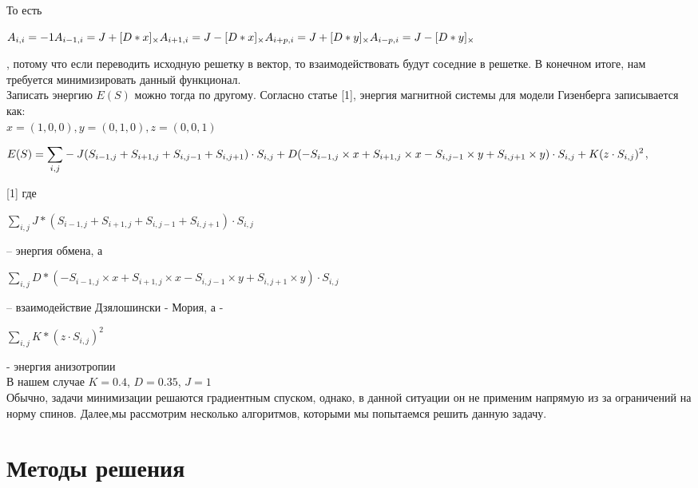 \documentclass[ 12pt,x11names]{article}
\begin{document}
    То есть  \begin{center} $A_{i, i} = -1 \\ A_{i - 1, i} =  J + [D*x]_\times \\
    A_{i+1, i} =  J - [D*x]_\times \\
    A_{i + p, i} =  J + [D*y]_\times \\
    A_{i - p , i} =  J -  [D*y]_\times$
     \end{center}, потому что если переводить исходную решетку в вектор, то взаимодействовать будут соседние в решетке.
    В конечном итоге, нам требуется минимизировать данный функционал.\\
    Записать энергию $E(S)$ можно тогда по другому.
    Согласно статье [1], энергия магнитной системы для модели Гизенберга записывается как:\\
    $x = (1,0, 0), y = (0,1, 0), z =(0, 0 , 1)$\\
        \begin{center}
    $E(S) = \displaystyle{\sum_{i, j}} - J (S_{i - 1, j} + S_{i + 1, j} + S_{i, j - 1} + S_{i, j + 1}) \cdot S_{i,j} + \\
    D  (-S_{i - 1, j} \times x  + S_{i + 1, j} \times x - S_{i, j - 1} \times y + S_{i, j + 1} \times y)\cdot S_{i,j}
    + \\
    K  (z \cdot S_{i,j}) ^ 2$,\\
    \end{center}[1]
    где
     \begin{center}
    $\displaystyle{\sum_{i, j}} J* (S_{i - 1, j} + S_{i + 1, j} + S_{i, j - 1} + S_{i, j + 1}) \cdot S_{i,j}$\end{center} -- энергия обмена, а \begin{center}
    $\displaystyle{\sum_{i, j}} D * (-S_{i - 1, j} \times x  + S_{i + 1, j} \times x - S_{i, j - 1} \times y + S_{i, j + 1} \times y)\cdot S_{i,j}$\end{center}  -- взаимодействие Дзялошински - Мория, а - \begin{center}
    $\displaystyle{\sum_{i, j}} K * (z \cdot S_{i,j}) ^ 2$\end{center} - энергия анизотропии\\
    В нашем случае $K = 0.4$, $D = 0.35$, $J = 1$\\
    Обычно, задачи минимизации решаются градиентным спуском, однако, в данной ситуации он не применим напрямую из за ограничений на норму спинов.
    Далее,мы рассмотрим несколько алгоритмов, которыми мы попытаемся решить данную задачу.
    \newpage
    \section{Методы решения}
\end{document}
